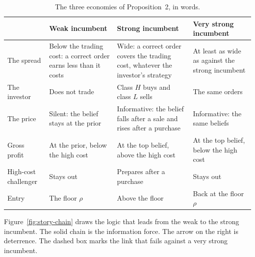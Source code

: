\begin{table}[t]
\centering\small
\caption{The three economies of Proposition~2, in words.}\label{tab:story-three}
\begin{tabular}{@{}>{\raggedright\arraybackslash}p{2.3cm}>{\raggedright\arraybackslash}p{3.8cm}>{\raggedright\arraybackslash}p{4.2cm}>{\raggedright\arraybackslash}p{3.7cm}@{}}
\toprule
 & Weak incumbent & Strong incumbent & Very strong incumbent\\
\midrule
The spread & Below the trading cost: a correct order earns less than it costs & Wide: a correct order covers the trading cost, whatever the investor's strategy & At least as wide as against the strong incumbent\\[2pt]
The investor & Does not trade & Class \(H\) buys and class \(L\) sells & The same orders\\[2pt]
The price & Silent: the belief stays at the prior & Informative: the belief falls after a sale and rises after a purchase & Informative: the same beliefs\\[2pt]
Gross profit & At the prior, below the high cost & At the top belief, above the high cost & At the top belief, below the high cost\\[2pt]
High-cost challenger & Stays out & Prepares after a purchase & Stays out\\[2pt]
Entry & The floor \(\rho\) & Above the floor & Back at the floor \(\rho\)\\
\bottomrule
\end{tabular}
\end{table}

Figure~\ref{fig:story-chain} draws the logic that leads from the weak to the strong incumbent. The solid chain is the information force. The arrow on the right is deterrence. The dashed box marks the link that fails against a very strong incumbent.

